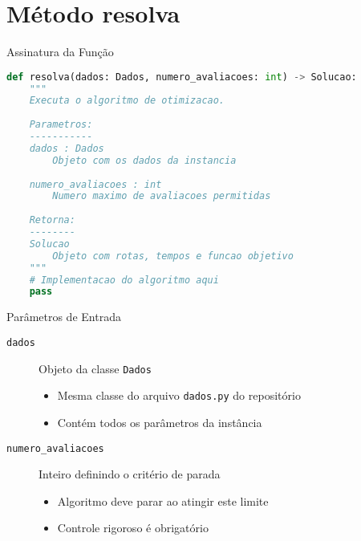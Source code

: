 \documentclass[10pt]{beamer}
\begin{document}
\section{Método resolva}

\begin{frame}[fragile]{Assinatura da Função}
    \begin{lstlisting}[language=Python]
def resolva(dados: Dados, numero_avaliacoes: int) -> Solucao:
    """
    Executa o algoritmo de otimizacao.
    
    Parametros:
    -----------
    dados : Dados
        Objeto com os dados da instancia
    
    numero_avaliacoes : int
        Numero maximo de avaliacoes permitidas
    
    Retorna:
    --------
    Solucao
        Objeto com rotas, tempos e funcao objetivo
    """
    # Implementacao do algoritmo aqui
    pass
    \end{lstlisting}
\end{frame}

\begin{frame}{Parâmetros de Entrada}
    \begin{description}
        \item[\texttt{dados}] Objeto da classe \texttt{Dados}
        \begin{itemize}
            \item Mesma classe do arquivo \texttt{dados.py} do repositório
            \item Contém todos os parâmetros da instância
        \end{itemize}
        
        \vspace{0.5cm}
        
        \item[\texttt{numero\_avaliacoes}] Inteiro definindo o critério de parada
        \begin{itemize}
            \item Algoritmo deve parar ao atingir este limite
            \item Controle rigoroso é obrigatório
        \end{itemize}
    \end{description}
\end{frame}
\end{document}
